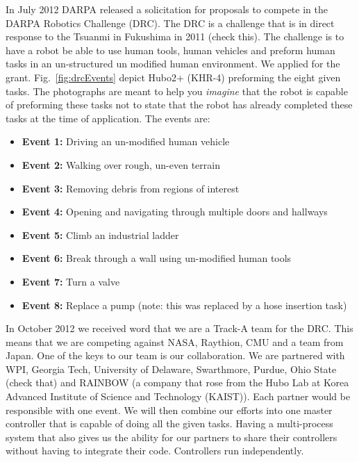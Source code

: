 In July 2012 DARPA released a solicitation for proposals to compete in the DARPA Robotics Challenge (DRC).
The DRC is a challenge that is in direct response to the Tsuanmi in Fukushima in 2011 (check this).
The challenge is to have a robot be able to use human tools, human vehicles and preform human tasks in an un-structured un modified human environment.
We applied for the grant.
Fig.~\ref{fig:drcEvents} depict Hubo2+ (KHR-4) preforming the eight given tasks.  
The photographs are meant to help you \textit{imagine} that the robot is capable of preforming these tasks not to state that the robot has already completed these tasks at the time of application.  
The events are:
\begin{itemize}
\item \textbf{Event 1:} Driving an un-modified human vehicle
\item \textbf{Event 2:} Walking over rough, un-even terrain
\item \textbf{Event 3:} Removing debris from regions of interest
\item \textbf{Event 4:} Opening and navigating through multiple doors and hallways
\item \textbf{Event 5:} Climb an industrial ladder
\item \textbf{Event 6:} Break through a wall using un-modified human tools
\item \textbf{Event 7:} Turn a valve
\item \textbf{Event 8:} Replace a pump (note: this was replaced by a hose insertion task)
\end{itemize}

In October 2012 we received word that we are a Track-A team for the DRC.
This means that we are competing against NASA, Raythion, CMU and a team from Japan.
One of the keys to our team is our collaboration.
We are partnered with WPI, Georgia Tech, University of Delaware, Swarthmore, Purdue, Ohio State (check that) and RAINBOW (a company that rose from the Hubo Lab at Korea Advanced Institute of Science and Technology (KAIST)).
Each partner would be responsible with one event.
We will then combine our efforts into one master controller that is capable of doing all the given tasks.
Having a multi-process system that also gives us the ability for our partners to share their controllers without having to integrate their code.  
Controllers run independently.

